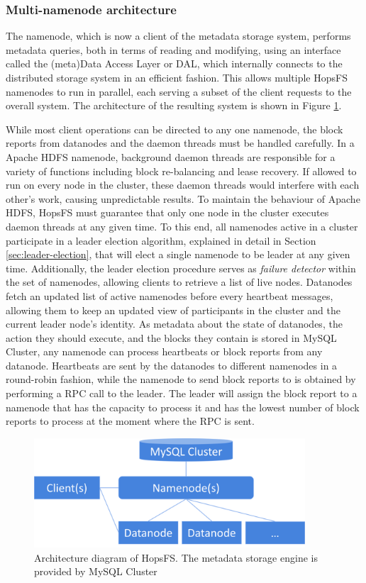 \subsubsection{Multi-namenode architecture}
The namenode, which is now a client of the metadata storage system, performs metadata queries, both in terms of reading and modifying, using an interface called the (meta)Data Access Layer or DAL, which internally connects to the distributed storage system in an efficient fashion.
This allows multiple HopsFS namenodes to run in parallel, each serving a subset of the client requests to the overall system.
The architecture of the resulting system is shown in Figure \ref{fig:hopsfs-architecture}.

While most client operations can be directed to any one namenode, the block reports from datanodes and the daemon threads must be handled carefully.
In a Apache HDFS namenode, background daemon threads are responsible for a variety of functions including block re-balancing and lease recovery.
If allowed to run on every node in the cluster, these daemon threads would interfere with each other's work, causing unpredictable results.
To maintain the behaviour of Apache HDFS, HopsFS must guarantee that only one node in the cluster executes daemon threads at any given time.
To this end, all namenodes active in a cluster participate in a leader election algorithm, explained in detail in Section \ref{sec:leader-election}, that will elect a single namenode to be leader at any given time.
Additionally, the leader election procedure serves as \emph{failure detector} within the set of namenodes, allowing clients to retrieve a list of live nodes.
Datanodes fetch an updated list of active namenodes before every heartbeat messages, allowing them to keep an updated view of participants in the cluster and the current leader node's identity.
As metadata about the state of datanodes, the action they should execute, and the blocks they contain is stored in MySQL Cluster, any namenode can process heartbeats or block reports from any datanode.
Heartbeats are sent by the datanodes to different namenodes in a round-robin fashion, while the namenode to send block reports to is obtained by performing a RPC call to the leader.
The leader will assign the block report to a namenode that has the capacity to process it and has the lowest number of block reports to process at the moment where the RPC is sent.

\begin{figure}[h]
\caption{Architecture diagram of HopsFS. The metadata storage engine is provided by MySQL Cluster}
\label{fig:hopsfs-architecture}
\centering
\includegraphics[width=0.9\textwidth]{images/hopsfs-block-diagram.png}
\end{figure}

